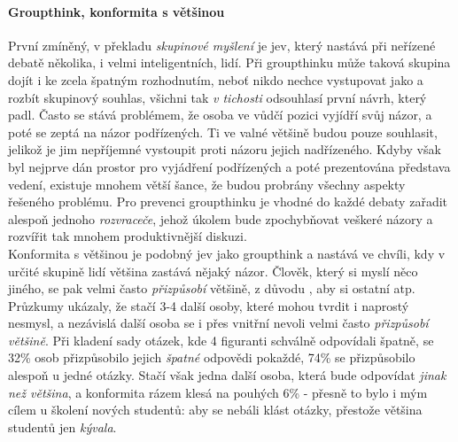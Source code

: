 \paragraph{Groupthink, konformita s většinou}
První zmíněný, v překladu \emph{skupinové myšlení} je jev, který nastává při neřízené debatě několika, i velmi inteligentních, lidí. Při groupthinku může taková skupina dojít i ke zcela špatným rozhodnutím, neboť nikdo nechce vystupovat jako  a rozbít skupinový souhlas, všichni tak \emph{v tichosti} odsouhlasí první návrh, který padl. Často se stává problémem, že osoba ve vůdčí pozici vyjídří svůj názor, a poté se zeptá na názor podřízených. Ti ve valné většině budou pouze souhlasit, jelikož je jim nepříjemné vystoupit proti názoru jejich nadřízeného. Kdyby však byl nejprve dán prostor pro vyjádření podřízených a poté prezentována představa vedení, existuje mnohem větší šance, že budou probrány všechny aspekty řešeného problému. Pro prevenci groupthinku je vhodné do každé debaty zařadit alespoň jednoho \emph{rozvraceče}, jehož úkolem bude zpochybňovat veškeré názory a rozvířit tak mnohem produktivnější diskuzi.\\
Konformita s většinou je podobný jev jako groupthink a nastává ve chvíli, kdy v určité skupině lidí většina zastává nějaký názor. Člověk, který si myslí něco jiného, se pak velmi často \emph{přizpůsobí} většině, z důvodu , aby si ostatní  atp. Průzkumy \cite{prochazka} ukázaly, že stačí 3-4 další osoby, které mohou tvrdit i naprostý nesmysl, a nezávislá další osoba se i přes vnitřní nevoli velmi často \emph{přizpůsobí většině}. Při kladení sady otázek, kde 4 figuranti schválně odpovídali špatně, se 32\% osob přizpůsobilo jejich \emph{špatné} odpovědi pokaždé, 74\% se přizpůsobilo alespoň u jedné otázky. Stačí však jedna další osoba, která bude odpovídat \emph{jinak než většina}, a konformita rázem klesá na pouhých 6\% - přesně to bylo i mým cílem u školení nových studentů: aby se nebáli klást otázky, přestože většina studentů jen \emph{kývala}.

